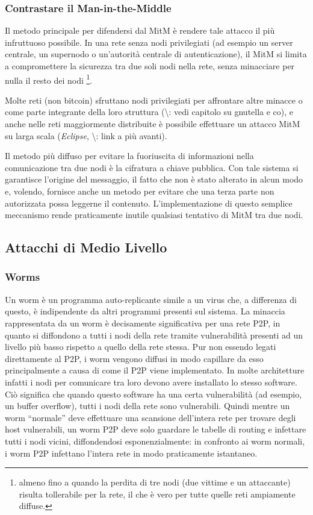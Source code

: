 \subsubsection{Contrastare il Man-in-the-Middle}\label{contrastare-il-man-in-the-middle}

Il metodo principale per difendersi dal MitM è rendere tale attacco il più infruttuoso possibile. In una rete senza nodi privilegiati (ad esempio un server centrale, un supernodo o un'autorità centrale di autenticazione), il MitM si limita a compromettere la sicurezza tra due soli nodi nella rete, senza minacciare per nulla il resto dei nodi \footnote{almeno fino a quando la perdita di tre nodi (due vittime e un   attaccante) risulta tollerabile per la rete, il che è vero per tutte   quelle reti ampiamente diffuse.}.

Molte reti (non bitcoin) sfruttano nodi privilegiati per affrontare altre minacce o come parte integrante della loro struttura (\textbackslash{}\TODO: vedi capitolo su gnutella e co), e anche nelle reti maggiormente distribuite è possibile effettuare un attacco MitM su larga scala (\emph{Eclipse}, \textbackslash{}\TODO: link a più avanti).

Il metodo più diffuso per evitare la fuoriuscita di informazioni nella comunicazione tra due nodi è la cifratura a chiave pubblica. Con tale sistema si garantisce l'origine del messaggio, il fatto che non è stato alterato in alcun modo e, volendo, fornisce anche un metodo per evitare che una terza parte non autorizzata possa leggerne il contenuto. L'implementazione di questo semplice meccanismo rende praticamente inutile qualsiasi tentativo di MitM tra due nodi.

\subsection{Attacchi di Medio Livello}\label{attacchi-di-medio-livello}

\subsubsection{Worms}\label{worms}

Un worm è un programma auto-replicante simile a un virus che, a differenza di questo, è indipendente da altri programmi presenti sul sistema. La minaccia rappresentata da un worm è decisamente significativa per una rete P2P, in quanto si diffondono a tutti i nodi della rete tramite vulnerabilità presenti ad un livello più basso rispetto a quello della rete stessa. Pur non essendo legati direttamente al P2P, i worm vengono diffusi in modo capillare da esso principalmente a causa di come il P2P viene implementato. In molte architetture infatti i nodi per comunicare tra loro devono avere installato lo stesso software. Ciò significa che quando questo software ha una certa vulnerabilità (ad esempio, un buffer overflow), tutti i nodi della rete sono vulnerabili. Quindi mentre un worm ``normale'' deve effettuare una scansione dell'intera rete per trovare degli host vulnerabili, un worm P2P deve solo guardare le tabelle di routing e infettare tutti i nodi vicini, diffondendosi esponenzialmente: in confronto ai worm normali, i worm P2P infettano l'intera rete in modo praticamente istantaneo.

